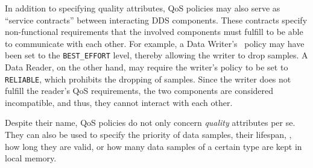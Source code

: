 In addition to specifying quality attributes, QoS policies may also serve as ``service contracts'' between interacting DDS components. These contracts specify non-functional requirements that the involved components must fulfill to be able to communicate with each other. For example, a Data Writer's \reliability\ policy may have been set to the \texttt{BEST\_EFFORT} level, thereby allowing the writer to drop samples. A Data Reader, on the other hand, may require the writer's policy to be set to \texttt{RELIABLE}, which prohibits the dropping of samples. Since the writer does not fulfill the reader's QoS requirements, the two components are considered incompatible, and thus, they cannot interact with each other.

Despite their name, QoS policies do not only concern \emph{quality} attributes per se. They can also be used to specify the priority of data samples, their lifespan, \ie , how long they are valid, or how many data samples of a certain type are kept in local memory.
%
%
%
%
%
%
%
%
%
%
%
%
%
%
%
%
%
%
%
%